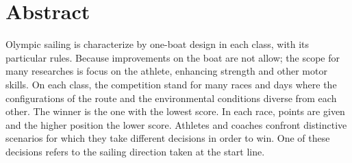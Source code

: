 



\chapter*{Abstract}
Olympic sailing is characterize by one-boat design in each class, with its particular rules. %
Because improvements on the boat are not allow; the scope for many researches is focus on the athlete, enhancing strength and other motor skills. On each class, the competition stand for many races and days where the configurations of the route and the environmental conditions diverse from each other. The winner is the one with the lowest score. In each race, points are given  and %
the higher position the lower score. Athletes and coaches confront distinctive scenarios for which they take different decisions in order to win. One of these decisions refers to the sailing direction taken at the start line.

